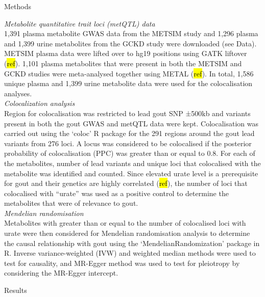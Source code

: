 \documentclass[a4paper,10pt]{article}
\begin{document}
\begin{center}
	\large{Methods}
\end{center}

\noindent
\textit{Metabolite quantitative trait loci (metQTL) data}\\
1,391 plasma metabolite GWAS data from the METSIM study and 1,296 plasma and 1,399 urine metabolites from the GCKD study were downloaded (see Data).
METSIM plasma data were lifted over to hg19 positions using GATK liftover (\hl{ref}).
1,101 plasma metabolites that were present in both the METSIM and GCKD studies were meta-analysed together using METAL (\hl{ref}).
In total, 1,586 unique plasma and 1,399 urine metabolite data were used for the colocalisation analyses.
\\

\noindent
\textit{Colocalization analysis}\\
Region for colocalisation was restricted to lead gout SNP ±500kb and variants present in both the gout GWAS and metQTL data were kept.
Colocalisation was carried out using the `coloc' R package for the 291 regions around the gout lead variants from 276 loci.
A locus was considered to be colocalised if the posterior probability of colocalisation (PPC) was greater than or equal to 0.8.
For each of the metabolites, number of lead variants and unique loci that colocalised with the metabolite was identified and counted.
Since elevated urate level is a prerequisite for gout and their genetics are highly correlated (\hl{ref}), the number of loci that colocalised with ``urate'' was used as a positive control to determine the metabolites that were of relevance to gout.
\\

\noindent
\textit{Mendelian randomisation}\\
Metabolites with greater than or equal to the number of colocalised loci with urate were then considered for Mendelian randomisation analysis to determine the causal relationship with gout using the ‘MendelianRandomization’ package in R.
Inverse variance-weighted (IVW) and weighted median methods were used to test for causality, and MR-Egger method was used to test for pleiotropy by considering the MR-Egger intercept.
\\

\begin{center}
	\large{Results}
\end{center}
\end{document}
